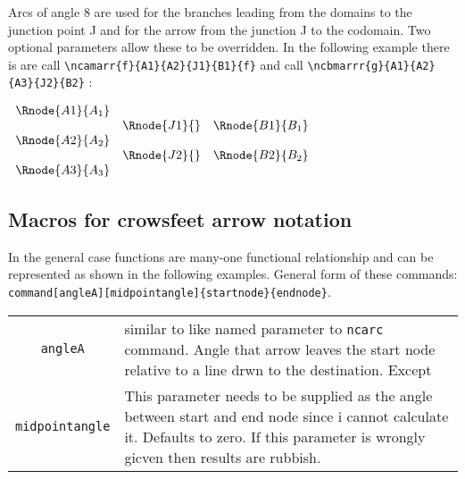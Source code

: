 \documentclass[10pt,a4paper]{article}
\begin{document}
Arcs of angle 8 are used for the branches leading from the domains to the junction point J and for the arrow from the junction J to the codomain.
Two optional parameters allow these to be overridden.
In the following example there is are call \verb!\ncamarr{f}{A1}{A2}{J1}{B1}{f}! and call
\verb!\ncbmarrr{g}{A1}{A2}{A3}{J2}{B2}! :
\setlength{\arraycolsep}{1cm}
\begin{center}
$
\begin{array}{cccc}
\Rnode{A1}{A_1}& & \\
                & \Rnode{J1}{}& \Rnode{B1}{B_1} \\
\Rnode{A2}{A_2}& & \\
                &  \Rnode{J2}{}& \Rnode{B2}{B_2} \\
\Rnode{A3}{A_3}& & \\
\end{array}
$

\end{center}
\setlength{\arraycolsep}{.2cm}

\subsection{Macros for crowsfeet arrow notation}

In the general case  functions  are many-one functional relationship and can be represented as shown in the following examples.
General form of these commands: \verb'command[angleA][midpointangle]{startnode}{endnode}'.
\begin{center}
\begin{tabular} {c p{5cm}}
\verb'angleA' & similar to like named parameter to \verb'ncarc' command. Angle that arrow leaves the start node relative to a line drwn to the destination. Except\\
\verb'midpointangle' & This parameter needs to be supplied as the angle between start and end node since i cannot calculate it. Defaults to zero. If this parameter is
                        wrongly gicven then results are rubbish.
\end{tabular}
\end{center}
\end{document}
